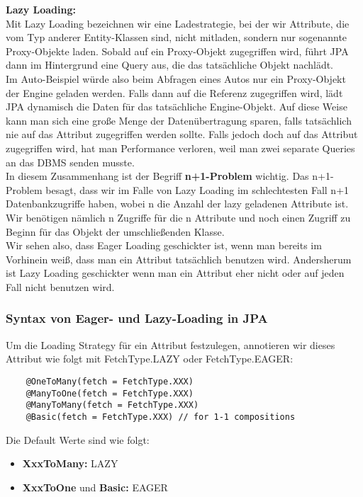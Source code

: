 \textbf{Lazy Loading:}\\
Mit Lazy Loading bezeichnen wir eine Ladestrategie, bei der wir Attribute, die vom Typ anderer Entity-Klassen sind, nicht mitladen, sondern nur sogenannte Proxy-Objekte laden. Sobald auf ein Proxy-Objekt zugegriffen wird, führt JPA dann im Hintergrund eine Query aus, die das tatsächliche Objekt nachlädt.\\
Im Auto-Beispiel würde also beim Abfragen eines Autos nur ein Proxy-Objekt der Engine geladen werden. Falls dann auf die Referenz zugegriffen wird, lädt JPA dynamisch die Daten für das tatsächliche Engine-Objekt. Auf diese Weise kann man sich eine große Menge der Datenübertragung sparen, falls tatsächlich nie auf das Attribut zugegriffen werden sollte. Falls jedoch doch auf das Attribut zugegriffen wird, hat man Performance verloren, weil man zwei separate Queries an das DBMS senden musste.\\
In diesem Zusammenhang ist der Begriff \textbf{n+1-Problem} wichtig. Das n+1-Problem besagt, dass wir im Falle von Lazy Loading im schlechtesten Fall n+1 Datenbankzugriffe haben, wobei n die Anzahl der lazy geladenen Attribute ist. Wir benötigen nämlich n Zugriffe für die n Attribute und noch einen Zugriff zu Beginn für das Objekt der umschließenden Klasse.\\

Wir sehen also, dass Eager Loading geschickter ist, wenn man bereits im Vorhinein weiß, dass man ein Attribut tatsächlich benutzen wird. Andersherum ist Lazy Loading geschickter wenn man ein Attribut eher nicht oder auf jeden Fall nicht benutzen wird.

\subsubsection{Syntax von Eager- und Lazy-Loading in JPA}

Um die Loading Strategy für ein Attribut festzulegen, annotieren wir dieses Attribut wie folgt mit FetchType.LAZY oder FetchType.EAGER:

\begin{lstlisting}
    @OneToMany(fetch = FetchType.XXX)
    @ManyToOne(fetch = FetchType.XXX)
    @ManyToMany(fetch = FetchType.XXX)
    @Basic(fetch = FetchType.XXX) // for 1-1 compositions
\end{lstlisting}

Die Default Werte sind wie folgt:

\begin{itemize}
    \item \textbf{XxxToMany:} LAZY
    \item \textbf{XxxToOne} und \textbf{Basic:} EAGER
\end{itemize}

